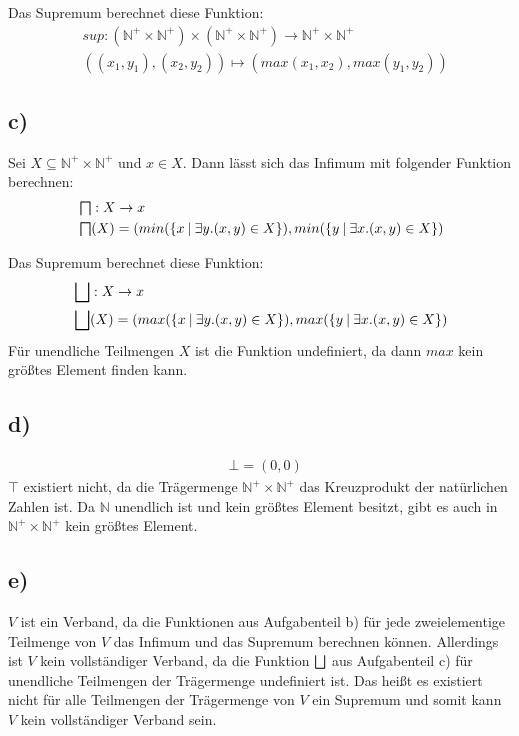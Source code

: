 Das Supremum berechnet diese Funktion:
\begin{align*}
&sup:  (\mathbb{N}^+ \times \mathbb{N}^+) \times  (\mathbb{N}^+ \times \mathbb{N}^+)  \to \mathbb{N}^+ \times \mathbb{N}^+ \\
&((x_1, y_1), (x_2, y_2))  \mapsto (max(x_1, x_2), max(y_1, y_2))
\end{align*}

\subsection*{c)}
Sei $ X \subseteq  \mathbb{N}^+ \times \mathbb{N}^+ $ und $ x \in X$. Dann lässt sich das Infimum mit folgender Funktion berechnen:
\begin{align*}
& \Inf : X \to x \\
& \Inf (X) = (min(\{x \medspace | \medspace \exists y. (x, y) \in X\}),
min(\{y \medspace| \medspace\exists x. (x, y) \in X\})
\end{align*}

Das Supremum berechnet diese Funktion:
\begin{align*}
& \bigsqcup : X \to x \\
& \bigsqcup (X) = (max(\{x \medspace| \medspace\exists y. (x, y) \in X\}),
max(\{y \medspace| \medspace\exists x. (x, y) \in X\})
\end{align*}
Für unendliche Teilmengen $X$ ist die Funktion undefiniert, da dann $max$ kein größtes Element finden kann.

\subsection*{d)}

\begin{align*}
& \bot = (0, 0)
\end{align*}
$\top $ existiert nicht, da die Trägermenge $ \mathbb{N}^+ \times \mathbb{N}^+ $ das Kreuzprodukt der natürlichen Zahlen ist.
Da $\mathbb{N} $ unendlich ist und kein größtes Element besitzt, gibt es auch in $ \mathbb{N}^+ \times \mathbb{N}^+ $ kein größtes Element.

\subsection*{e)}
$V$ ist ein Verband, da die Funktionen aus Aufgabenteil b) für jede zweielementige
 Teilmenge von $V$ das Infimum und das Supremum berechnen können.
Allerdings ist $V$ kein vollständiger Verband, da die Funktion $\bigsqcup$ aus
Aufgabenteil c) für unendliche Teilmengen der Trägermenge undefiniert ist.
Das heißt es existiert nicht für alle Teilmengen der Trägermenge von $V$
 ein Supremum und somit kann $V$ kein vollständiger Verband sein.


